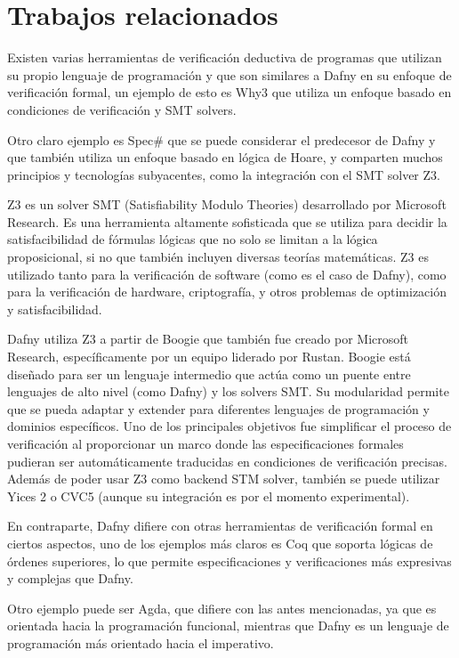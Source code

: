 \documentclass[runningheads]{llncs}
\begin{document}
\section{Trabajos relacionados} 
Existen varias herramientas de verificación deductiva de programas que utilizan su propio lenguaje de programación 
y que son similares a Dafny en su enfoque de verificación formal, 
un ejemplo de esto es Why3 que utiliza un enfoque basado en condiciones de verificación y SMT solvers.

Otro claro ejemplo es Spec\# que se puede considerar el predecesor de Dafny y que también utiliza un enfoque basado en lógica de Hoare,
y comparten muchos principios y tecnologías subyacentes, como la integración con el SMT solver Z3.

Z3 es un solver SMT (Satisfiability Modulo Theories) desarrollado por Microsoft Research. 
Es una herramienta altamente sofisticada que se utiliza para decidir la satisfacibilidad de fórmulas lógicas que no solo se limitan a la lógica proposicional, 
si no que también incluyen diversas teorías matemáticas.
Z3 es utilizado tanto para la verificación de software (como es el caso de Dafny),
como para la verificación de hardware, criptografía, y otros problemas de optimización y satisfacibilidad.

Dafny utiliza Z3 a partir de Boogie que también fue creado por Microsoft Research, específicamente por un equipo liderado por Rustan. 
Boogie está diseñado para ser un lenguaje intermedio que actúa como un puente entre lenguajes de alto nivel (como Dafny) y los solvers SMT. 
Su modularidad permite que se pueda adaptar y extender para diferentes lenguajes de programación y dominios específicos.
Uno de los principales objetivos fue simplificar el proceso de verificación al proporcionar un marco donde las especificaciones formales pudieran ser automáticamente 
traducidas en condiciones de verificación precisas. Además de poder usar Z3 como backend STM solver, 
también se puede utilizar Yices 2 o CVC5 (aunque su integración es por el momento experimental).

En contraparte, Dafny difiere con otras herramientas de verificación formal en ciertos aspectos, uno de los ejemplos más claros es Coq 
que soporta lógicas de órdenes superiores, lo que permite especificaciones y verificaciones más expresivas y complejas que Dafny.

Otro ejemplo puede ser Agda, que difiere con las antes mencionadas, ya que 
es orientada hacia la programación funcional, mientras que Dafny es un lenguaje de programación más orientado hacia el imperativo. 
 
\end{document}
